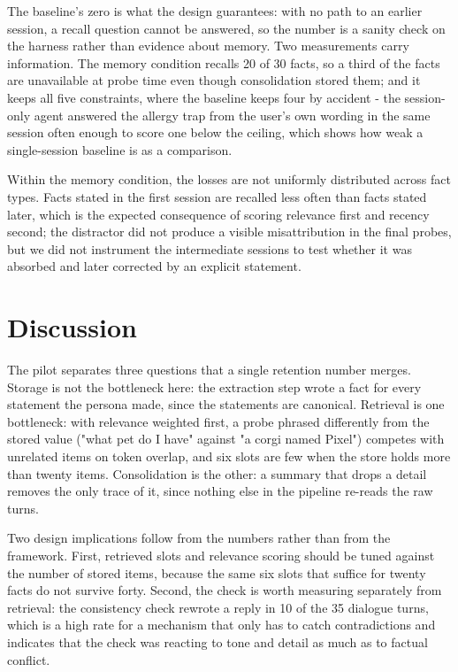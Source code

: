\documentclass[runningheads,a4paper]{llncs}
\begin{document}
The baseline's zero is what the design guarantees: with no path to an earlier session, a recall question cannot be answered, so the number is a sanity check on the harness rather than evidence about memory. Two measurements carry information. The memory condition recalls 20 of 30 facts, so a third of the facts are unavailable at probe time even though consolidation stored them; and it keeps all five constraints, where the baseline keeps four by accident - the session-only agent answered the allergy trap from the user's own wording in the same session often enough to score one below the ceiling, which shows how weak a single-session baseline is as a comparison.

Within the memory condition, the losses are not uniformly distributed across fact types. Facts stated in the first session are recalled less often than facts stated later, which is the expected consequence of scoring relevance first and recency second; the distractor did not produce a visible misattribution in the final probes, but we did not instrument the intermediate sessions to test whether it was absorbed and later corrected by an explicit statement.

\section{Discussion}

The pilot separates three questions that a single retention number merges. Storage is not the bottleneck here: the extraction step wrote a fact for every statement the persona made, since the statements are canonical. Retrieval is one bottleneck: with relevance weighted first, a probe phrased differently from the stored value ("what pet do I have" against "a corgi named Pixel") competes with unrelated items on token overlap, and six slots are few when the store holds more than twenty items. Consolidation is the other: a summary that drops a detail removes the only trace of it, since nothing else in the pipeline re-reads the raw turns.

Two design implications follow from the numbers rather than from the framework. First, retrieved slots and relevance scoring should be tuned against the number of stored items, because the same six slots that suffice for twenty facts do not survive forty. Second, the check is worth measuring separately from retrieval: the consistency check rewrote a reply in 10 of the 35 dialogue turns, which is a high rate for a mechanism that only has to catch contradictions and indicates that the check was reacting to tone and detail as much as to factual conflict.
\end{document}
